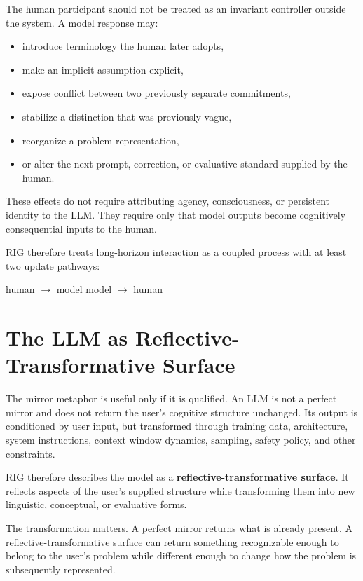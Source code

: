 \documentclass[12pt]{article}
\begin{document}
The human participant should not be treated as an invariant controller outside the system. A model response may:

\begin{itemize}
\item introduce terminology the human later adopts,
\item make an implicit assumption explicit,
\item expose conflict between two previously separate commitments,
\item stabilize a distinction that was previously vague,
\item reorganize a problem representation,
\item or alter the next prompt, correction, or evaluative standard supplied by the human.
\end{itemize}

These effects do not require attributing agency, consciousness, or persistent identity to the LLM. They require only that model outputs become cognitively consequential inputs to the human.

RIG therefore treats long-horizon interaction as a coupled process with at least two update pathways:

\begin{center}
human $\rightarrow$ model
\qquad
model $\rightarrow$ human
\end{center}

\section{The LLM as Reflective-Transformative Surface}

The mirror metaphor is useful only if it is qualified. An LLM is not a perfect mirror and does not return the user's cognitive structure unchanged. Its output is conditioned by user input, but transformed through training data, architecture, system instructions, context window dynamics, sampling, safety policy, and other constraints.

RIG therefore describes the model as a \textbf{reflective-transformative surface}. It reflects aspects of the user's supplied structure while transforming them into new linguistic, conceptual, or evaluative forms.

The transformation matters. A perfect mirror returns what is already present. A reflective-transformative surface can return something recognizable enough to belong to the user's problem while different enough to change how the problem is subsequently represented.
\end{document}
